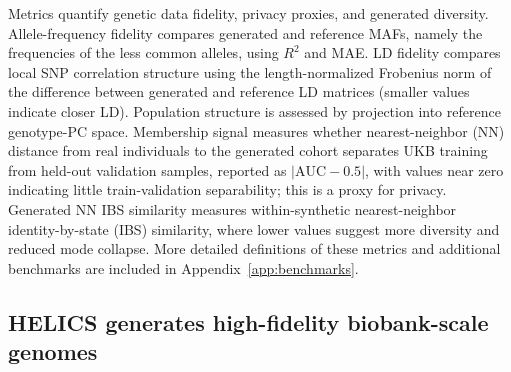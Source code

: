 \documentclass{article}
\begin{document}
Metrics quantify genetic data fidelity, privacy proxies, and generated diversity. Allele-frequency fidelity compares generated and reference MAFs, namely the frequencies of the less common alleles, using \(R^2\) and MAE. LD fidelity compares local SNP correlation structure using the length-normalized Frobenius norm of the difference between generated and reference LD matrices (smaller values indicate closer LD). Population structure is assessed by projection into reference genotype-PC space. Membership signal measures whether nearest-neighbor (NN) distance from real individuals to the generated cohort separates UKB training from held-out validation samples, reported as \(|\mathrm{AUC}-0.5|\), with values near zero indicating little train-validation separability; this is a proxy for privacy. Generated NN IBS similarity measures within-synthetic nearest-neighbor identity-by-state (IBS) similarity, where lower values suggest more diversity and reduced mode collapse. More detailed definitions of these metrics and additional benchmarks are included in Appendix~\ref{app:benchmarks}.



\subsection{HELICS generates high-fidelity biobank-scale genomes}
\label{sec:genBench}
\end{document}
